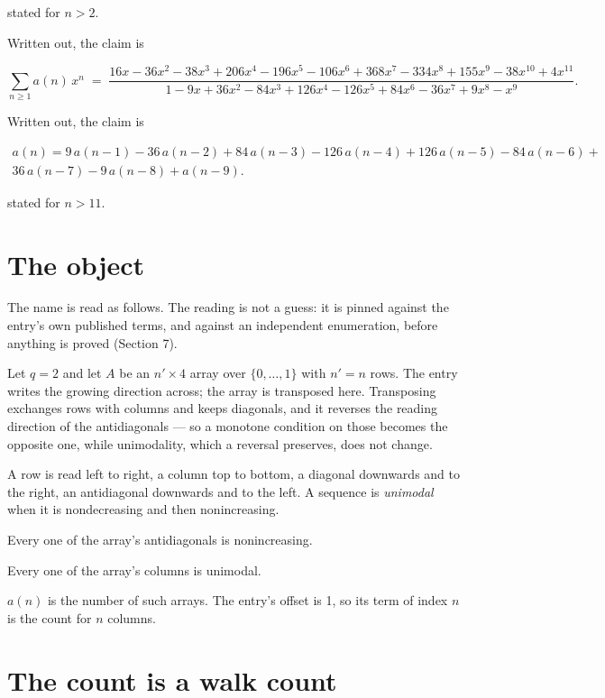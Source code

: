 \documentclass[11pt]{article}
\theoremstyle{definition}
\begin{document}
stated for $n > 2$.

Written out, the claim is

\[\sum_{n \ge 1} a(n)\,x^n \;=\; \frac{16x - 36x^{2} - 38x^{3} + 206x^{4} - 196x^{5} - 106x^{6} + 368x^{7} - 334x^{8} + 155x^{9} - 38x^{10} + 4x^{11}}{1 - 9x + 36x^{2} - 84x^{3} + 126x^{4} - 126x^{5} + 84x^{6} - 36x^{7} + 9x^{8} - x^{9}}.\]

Written out, the claim is

\begin{multline*} a(n) = 9\,a(n-1) - 36\,a(n-2) + 84\,a(n-3) - 126\,a(n-4) + 126\,a(n-5) - 84\,a(n-6) + \\ 36\,a(n-7) - 9\,a(n-8) + a(n-9). \end{multline*}

stated for $n > 11$.

\section{The object}

The name is read as follows. The reading is not a guess: it is pinned against the entry's own published terms, and against an independent enumeration, before anything is proved (Section 7).

Let $q = 2$ and let $A$ be an $n' \times 4$ array over $\{0,\dots,1\}$ with $n' = n$ rows. The entry writes the growing direction across; the array is transposed here. Transposing exchanges rows with columns and keeps diagonals, and it reverses the reading direction of the antidiagonals --- so a monotone condition on those becomes the opposite one, while unimodality, which a reversal preserves, does not change.

A row is read left to right, a column top to bottom, a diagonal downwards and to the right, an antidiagonal downwards and to the left. A sequence is {\itshape unimodal} when it is nondecreasing and then nonincreasing.

Every one of the array's antidiagonals is nonincreasing.

Every one of the array's columns is unimodal.

$a(n)$ is the number of such arrays. The entry's offset is 1, so its term of index $n$ is the count for $n$ columns.

\section{The count is a walk count}
\end{document}
